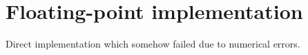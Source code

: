 \section{Floating-point implementation}

Direct implementation which somehow failed due to numerical errors.